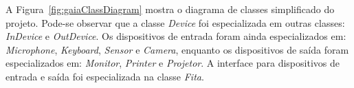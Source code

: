 A Figura~\ref{fig:gaiaClassDiagram} mostra o diagrama de classes simplificado do projeto. Pode-se observar que a classe \emph{Device} foi especializada em outras classes: \emph{InDevice} e \emph{OutDevice}. Os dispositivos de entrada foram ainda especializados em: \emph{Microphone}, \emph{Keyboard}, \emph{Sensor} e \emph{Camera}, enquanto os dispositivos de saída foram especializados em: \emph{Monitor}, \emph{Printer} e \emph{Projetor}. A interface para dispositivos de entrada e saída foi especializada na classe \emph{Fita}.